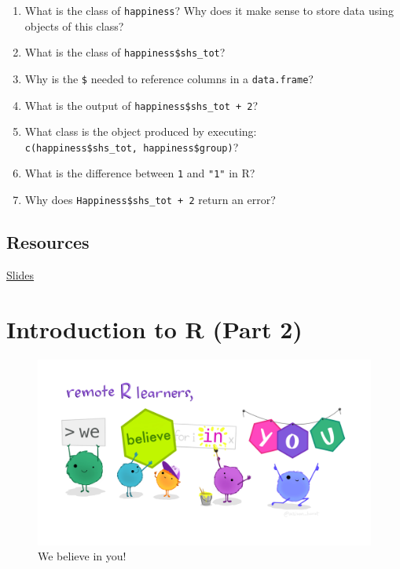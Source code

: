 \documentclass[
]{book}
\providecommand{\tightlist}{%
  \setlength{\itemsep}{0pt}\setlength{\parskip}{0pt}}
\begin{document}
\begin{enumerate}
\def\labelenumi{\arabic{enumi}.}
\tightlist
\item
  What is the class of \texttt{happiness}? Why does it make sense to store data using objects of this class?
\item
  What is the class of \texttt{happiness\$shs\_tot}?
\item
  Why is the \texttt{\$} needed to reference columns in a \texttt{data.frame}?
\item
  What is the output of \texttt{happiness\$shs\_tot\ +\ 2}?
\item
  What class is the object produced by executing: \texttt{c(happiness\$shs\_tot,\ happiness\$group)}?
\item
  What is the difference between \texttt{1} and \texttt{"1"} in R?
\item
  Why does \texttt{Happiness\$shs\_tot\ +\ 2} return an error?
\end{enumerate}

\hypertarget{resources}{%
\section{Resources}\label{resources}}

\href{../assets/documents/01-intro-to-r-1-slides.pdf}{Slides}

\hypertarget{intro2}{%
\chapter{Introduction to R (Part 2)}\label{intro2}}

\begin{figure}
\centering
\includegraphics{img/monster_support.jpg}
\caption{We believe in you!}
\end{figure}
\end{document}
